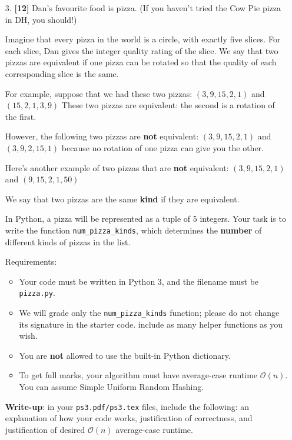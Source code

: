 \documentclass{assignment-263}
\begin{document}
\begin{enumerate}
	\item[3.] \textbf{[12]} Dan's favourite food is pizza. (If you haven't
		tried the Cow Pie pizza in DH, you should!)

		Imagine that every pizza in the world is a circle, with exactly five slices.
		For each slice, Dan gives the integer quality rating of the slice. We say
		that two pizzas are equivalent if one pizza can be rotated so that the
		quality of each corresponding slice is the same.

		For example, suppose that we had these two pizzas:
		$(3, 9, 15, 2, 1)$
		and
		$(15, 2, 1, 3, 9)$
		These two pizzas are equivalent: the second is a rotation of the first.

		However, the following two pizzas are {\bf not} equivalent:
		$(3, 9, 15, 2, 1)$
		and
		$(3, 9, 2, 15, 1)$
		because no rotation of one pizza can give you the other.

		Here's another example of two pizzas that are {\bf not} equivalent:
		$(3, 9, 15, 2, 1)$
		and
		$(9, 15, 2, 1, 50)$

		We say that two pizzas are the same {\bf kind} if they are equivalent.

		In Python, a pizza will be represented as a tuple of 5 integers.
		Your task is to write the function \verb|num_pizza_kinds|, which
		determines the \textbf{number} of different kinds of pizzas in the
		list.


Requirements:
\begin{itemize}
\item Your code must be written in Python 3, and the filename must be \verb|pizza.py|.
\item We will grade only the \verb|num_pizza_kinds| function; please do not change its signature in the starter code. include as many helper functions as you wish.
   \item You are {\bf not} allowed to use the built-in Python
			dictionary.
			\item To get full marks, your algorithm must have average-case runtime
				$\mathcal{O}(n)$. You can assume Simple Uniform Random Hashing.
   \end{itemize}

\textbf{Write-up}: in your \verb|ps3.pdf/ps3.tex| files, include the following: an explanation of how your code works, justification of correctness, and
 justification of desired $\mathcal{O}(n)$ average-case runtime.
 

\end{enumerate}
\end{document}
